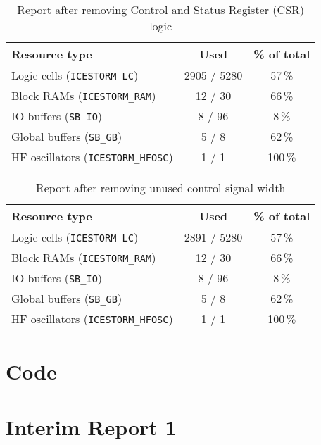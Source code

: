 \documentclass[a4paper,10pt]{article}
\begin{document}
\begin{table}[H] 
    \centering
    \begin{tabularx}{0.6\textwidth}{X c c}
        \toprule
        Resource type & Used & \% of total \\ \midrule
        Logic cells (\texttt{ICESTORM\_LC}) & 2905 / 5280 & 57\,\% \\
        Block RAMs (\texttt{ICESTORM\_RAM}) & 12 / 30 & 66\,\% \\
        IO buffers (\texttt{SB\_IO}) & 8 / 96 & 8\,\% \\
        Global buffers (\texttt{SB\_GB}) & 5 / 8 & 62\,\% \\
        HF oscillators (\texttt{ICESTORM\_HFOSC}) & 1 / 1 & 100\,\% \\
        \bottomrule
    \end{tabularx}
    \caption{Report after removing Control and Status Register (CSR) logic}
    \label{tab:CSR}
\end{table}

\begin{table}[H] 
    \centering
    \begin{tabularx}{0.6\textwidth}{X c c}
        \toprule
        Resource type & Used & \% of total \\ \midrule
        Logic cells (\texttt{ICESTORM\_LC}) & 2891 / 5280 & 57\,\% \\
        Block RAMs (\texttt{ICESTORM\_RAM}) & 12 / 30 & 66\,\% \\
        IO buffers (\texttt{SB\_IO}) & 8 / 96 & 8\,\% \\
        Global buffers (\texttt{SB\_GB}) & 5 / 8 & 62\,\% \\
        HF oscillators (\texttt{ICESTORM\_HFOSC}) & 1 / 1 & 100\,\% \\
        \bottomrule
    \end{tabularx}
    \caption{Report after removing unused control signal width}
    \label{tab:Signal_Width}
\end{table}

\section{Code}

\section{Interim Report 1}
\label{sec:{Interim_Report_1}}

\end{document}
